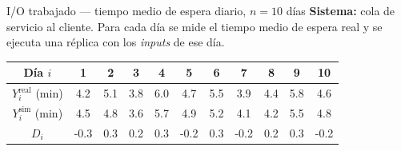\documentclass[aspectratio=1610, 10pt]{beamer}
\begin{document}
\begin{frame}{I/O trabajado — tiempo medio de espera diario, $n=10$ días}
  \footnotesize
  \textbf{Sistema:} cola de servicio al cliente. Para cada día se mide el tiempo
  medio de espera real y se ejecuta una réplica con los \emph{inputs} de ese día.

  \vspace{2pt}
  \begin{center}\scriptsize
    \renewcommand{\arraystretch}{1.2}
    \begin{tabular}{ccccccccccc}
      \toprule
      Día $i$ & 1 & 2 & 3 & 4 & 5 & 6 & 7 & 8 & 9 & 10 \\
      \midrule
      $Y_i^{\text{real}}$ (min) & 4.2 & 5.1 & 3.8 & 6.0 & 4.7 & 5.5 & 3.9 & 4.4 & 5.8 & 4.6 \\
      $Y_i^{\text{sim}}$  (min) & 4.5 & 4.8 & 3.6 & 5.7 & 4.9 & 5.2 & 4.1 & 4.2 & 5.5 & 4.8 \\
      $D_i$                     & -0.3 & 0.3 & 0.2 & 0.3 & -0.2 & 0.3 & -0.2 & 0.2 & 0.3 & -0.2 \\
      \bottomrule
    \end{tabular}
  \end{center}


\end{frame}
\end{document}
